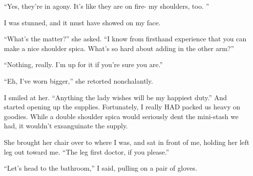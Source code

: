 ``Yes, they're in agony. It's like they are on fire- my shoulders, too. ''

I was stunned, and it must have showed on my face.

``What's the matter?'' she asked. ``I know from firsthand experience that you can make a nice
shoulder spica. What's so hard about adding in the other arm?''

``Nothing, really. I'm up for it if you're sure you are.''

``Eh, I've worn bigger,'' she retorted nonchalantly.

I smiled at her. ``Anything the lady wishes will be my happiest duty.'' And started opening
up the supplies. Fortunately, I really HAD packed us heavy on goodies. While a double shoulder
spica would seriously dent the mini-stash we had, it wouldn't exsanguinate the supply.

She brought her chair over to where I was, and sat in front of me, holding her left leg out
toward me. ``The leg first doctor, if you please.''

``Let's head to the bathroom,'' I said, pulling on a pair of gloves.

